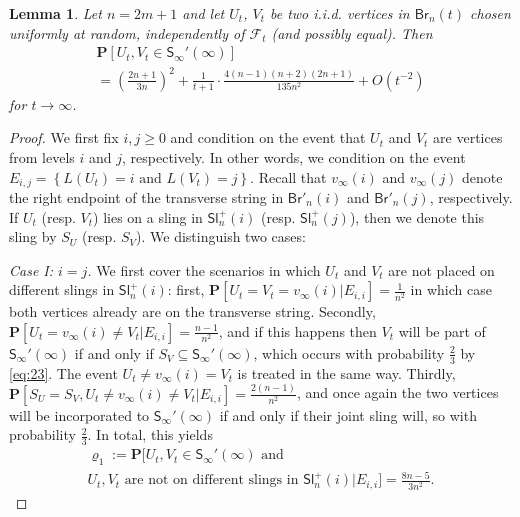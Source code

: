 \documentclass[a4paper,11pt,reqno]{amsart}
\newcommand{\bP}{\mathbf{P}}
\newcommand{\Br}{\mathsf{Br}}
\newcommand{\Slr}{\mathsf{Sl}^+}
\newcommand{\Soo}{\mathsf{S}_\infty}
\newcommand{\F}{\mathscr{F}}
\newcommand{\ssq}{\subseteq}
\newtheorem{lemma}{Lemma}
\theoremstyle{definition}
\begin{document}
\begin{lemma}\label{lemma:SooVar}
 Let $n=2m+1$ and let $U_t$, $V_t$ be two i.i.d. vertices in $\Br_n(t)$ chosen uniformly at random, independently of $\F_t$ (and possibly equal). Then
 \begin{multline}\label{eq:UtVt}
  \bP[U_t,V_t\in\Soo'(\infty)]\\
  =\left(\frac{2n+1}{3n}\right)^2 + \frac{1}{t+1}\cdot \frac{4(n-1)(n+2)(2n+1)}{135n^2} + O(t^{-2})
 \end{multline}
 for $t\to\infty$. 
\end{lemma}
\begin{proof}
 We first fix $i,j \geq 0$ and condition on the event that $U_t$ and $V_t$ are vertices from levels $i$ and $j$, respectively.  In other words, we condition on the event $E_{i,j}=\left\{ L(U_t)=i\text{ and }L(V_t)=j\right\}$. Recall that $v_\infty(i)$ and $v_\infty(j)$ denote the right endpoint of the transverse string in $\Br'_n(i)$ and $\Br'_n(j)$, respectively.
 If $U_t$ (resp. $V_t$) lies on a sling in $\Slr_n(i)$ (resp. $\Slr_n(j)$), then we denote this sling by $S_U$ (resp. $S_V$). We distinguish two cases:
 
 \emph{Case I: $i=j$.} We first cover the scenarios in which $U_t$ and $V_t$ are not placed on different slings in $\Slr_n(i)$: first, $\bP[U_t=V_t=v_\infty(i)|E_{i,i}]=\frac{1}{n^2}$ in which case both vertices already are on the transverse string. Secondly, $\bP[U_t=v_\infty(i)\neq V_t|E_{i,i}]=\frac{n-1}{n^2}$, and if this happens then $V_t$ will be part of $\Soo'(\infty)$ if and only if $S_V\ssq\Soo'(\infty)$, which occurs with probability $\frac{2}{3}$ by \eqref{eq:23}. The event $U_t\neq v_\infty(i)=V_t$ is treated in the same way. Thirdly, $\bP[S_U=S_V, U_t\neq v_\infty(i)\neq V_t|E_{i,i}]=\frac{2(n-1)}{n^2}$, and once again the two vertices will be incorporated to $\Soo'(\infty)$ if and only if their joint sling will, so with probability $\frac{2}{3}$. In total, this yields
 \begin{multline*}
  \varrho_1:=\bP[U_t,V_t\in\Soo'(\infty) \text{ and }\\ 
  U_t,V_t \text{ are not on different slings in }\Slr_n(i)|E_{i,i}]=\frac{8n-5}{3n^2}.
 \end{multline*}


\end{proof}
\end{document}
